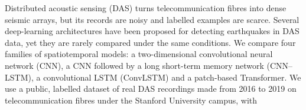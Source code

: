 Distributed acoustic sensing (DAS) turns telecommunication fibres into dense seismic arrays, but its records are noisy and labelled examples are scarce. Several deep-learning architectures have been proposed for detecting earthquakes in DAS data, yet they are rarely compared under the same conditions. We compare four families of spatiotemporal models: a two-dimensional convolutional neural network (CNN), a CNN followed by a long short-term memory network (CNN--LSTM), a convolutional LSTM (ConvLSTM) and a patch-based Transformer. We use a public, labelled dataset of real DAS recordings made from 2016 to 2019 on telecommunication fibres under the Stanford University campus, with %
